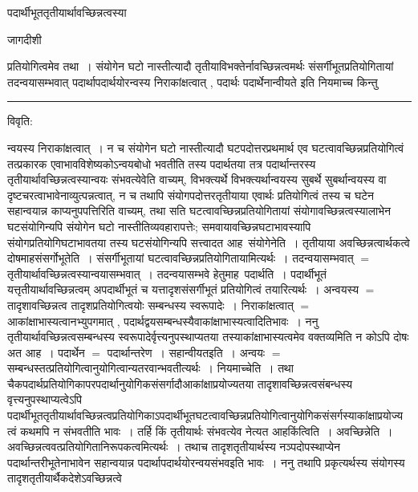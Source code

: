 \documentclass[10pt, openany]{book}
\begin{document}
{पदार्थीभूततृतीयार्थावच्छिन्नत्वस्या
\newpage
\begin{center} जागदीशी \end{center}
{\la प्रतियोगित्वमेव तथा~। संयोगेन घटो नास्तीत्यादौ तृतीयाविभक्तेर्नावच्छिन्नत्वमर्थः संसर्गीभूतप्रतियोगितायां तदन्वयासम्भवात् पदार्थापदार्थयोरन्वस्य निराकांक्षत्वात् , पदार्थः पदार्थेनान्वीयते इति नियमाच्च किन्तु}\\
\hrule
\begin{center}
विवृति:    
\end{center}
न्वयस्य निराकांक्षत्वात्~। न च संयोगेन घटो नास्तीत्यादौ
घटपदोत्तरप्रथमार्थ एव
घटत्वावच्छिन्नप्रतियोगित्वं तत्प्रकारक एवाभावविशेष्यकोऽन्वयबोधो भवतीति
तस्य पदार्थतया तत्र पदार्थान्तरस्य तृतीयार्थावच्छिन्नत्वस्यान्वयः
संभवत्येवेति वाच्यम्, विभक्त्यर्थे विभक्त्यर्थान्वयस्य सुबर्थे सुबर्थान्वयस्य वा
दृष्टचरत्वाभावेनाव्युत्पन्नत्वात्, न च तथापि संयोगपदोत्तरतृतीयाया एवार्थः प्रतियोगित्वं तस्य च घटेन सहान्वयान्न काप्यनुपपत्तिरिति वाच्यम्, तथा सति
घटत्वावच्छिन्नप्रतियोगितायां
संयोगावच्छिन्नत्वस्यालाभेन घटसंयोगिन्यपि संयोगेन घटो नास्तीतिव्यवहारापत्तेः; समवायावच्छिन्नघटाभावस्यापि संयोगप्रतियोगिघटाभावतया तस्य घटसंयोगिन्यपि सत्त्वादत आह\textemdash\ संयोगेनेति~। तृतीयाया अवच्छिन्नत्वार्थकत्वे
दोषमाह\textendash संसर्गोभूतेति~। संसर्गीभूतायां
घटत्वावच्छिन्नप्रतियोगितायामित्यर्थः~।
तदन्वयासम्भवात् $=$ तृतीयार्थावच्छिन्नत्वस्यान्वयासम्भवात्~। तदन्वयासम्भवे
हेतुमाह\textemdash\ पदार्थति~। पदार्थीभूतं यत्तृतीयार्थावच्छिन्नत्वम् अपदार्थीभूतं च यत्तादृशसंसर्गीभूतं प्रतियोगित्वं तयारित्यर्थः~।
अन्वयस्य $=$ तादृशावच्छिन्नत्व तादृशप्रतियोगित्वयोः सम्बन्धस्य स्वरूपादेः~।
निराकांक्षत्वात् $=$ आकांक्षाभास्यत्वानभ्युपगमात् , पदार्थद्वयसम्बन्धस्यैवाकांक्षाभास्यत्वादितिभावः~। ननु
तृतीयार्थावच्छिन्नत्वसम्बन्धस्य स्वरूपादेर्वृत्त्यनुपस्थाप्यतया
तस्याकांक्षाभास्यत्वमेव
वक्तव्यमिति न कोऽपि दोषः अत आह~।
 पदार्थेन $=$ पदार्थान्तरेण~। {\qt सहान्वीयतइति}~। अन्वयः $=$ सम्बन्धस्तत्प्रतियोगित्वानुयोगित्वान्यतरवान्भवतीत्यर्थः~। {\qt नियमाच्चेति}~। तथा चैकपदार्थप्रतियोगिकापरपदार्थानुयोगिकसंसर्गादौआकांक्षाप्रयोज्यतया
तादृशावच्छिन्नत्वसंबन्धस्य वृत्त्यनुपस्थाप्यत्वेऽपि
पदार्थीभूततृतीयार्थावच्छिन्नत्वप्रतियोगिकाऽपदार्थीभूतघटत्वावच्छिन्नप्रतियोगित्वानुयोगिकसंसर्गस्याकांक्षाप्रयोज्यत्वं कथमपि न
संभवतीति भावः~। तर्हि किं तृतीयार्थः संभवत्येव नेत्यत आह\textendash  किंत्विति~।
अवच्छिन्नेति~। अवच्छिन्नत्ववत्प्रतियोगितानिरूपकत्वमित्यर्थः~। तथाच
तादृशतृतीयार्थस्य नञ्पदोपस्थाप्येन पदार्थान्तरीभूतेनाभावेन सहान्वयान्न
पदार्थापदार्थयोरन्वयसंभवइति भावः~। ननु तथापि प्रकृत्यर्थस्य संयोगस्य
तादृशतृतीयार्थैकदेशेऽवच्छिन्नत्वे
}
\end{document}
